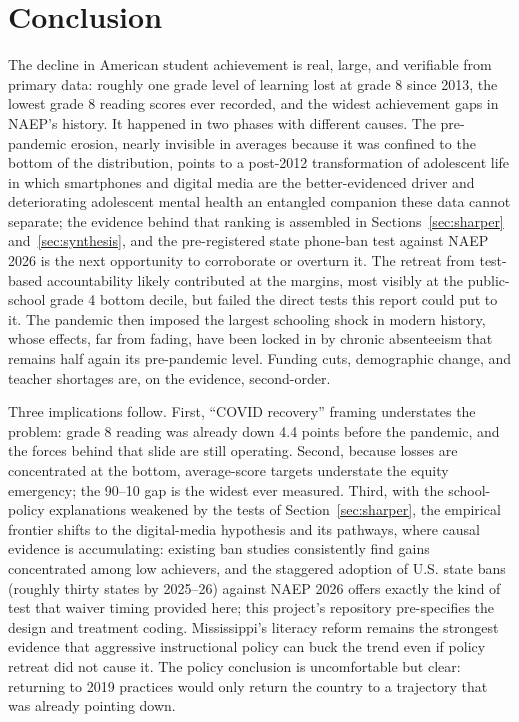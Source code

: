 \documentclass[11pt]{article}
\begin{document}
\section{Conclusion}

The decline in American student achievement is real, large, and verifiable from primary data: roughly one grade level of learning lost at grade 8 since 2013, the lowest grade 8 reading scores ever recorded, and the widest achievement gaps in NAEP's history. It happened in two phases with different causes. The pre-pandemic erosion, nearly invisible in averages because it was confined to the bottom of the distribution, points to a post-2012 transformation of adolescent life in which smartphones and digital media are the better-evidenced driver and deteriorating adolescent mental health an entangled companion these data cannot separate; the evidence behind that ranking is assembled in Sections~\ref{sec:sharper} and~\ref{sec:synthesis}, and the pre-registered state phone-ban test against NAEP 2026 is the next opportunity to corroborate or overturn it. The retreat from test-based accountability likely contributed at the margins, most visibly at the public-school grade 4 bottom decile, but failed the direct tests this report could put to it. The pandemic then imposed the largest schooling shock in modern history, whose effects, far from fading, have been locked in by chronic absenteeism that remains half again its pre-pandemic level. Funding cuts, demographic change, and teacher shortages are, on the evidence, second-order.

Three implications follow. First, ``COVID recovery'' framing understates the problem: grade 8 reading was already down 4.4 points before the pandemic, and the forces behind that slide are still operating. Second, because losses are concentrated at the bottom, average-score targets understate the equity emergency; the 90--10 gap is the widest ever measured. Third, with the school-policy explanations weakened by the tests of Section~\ref{sec:sharper}, the empirical frontier shifts to the digital-media hypothesis and its pathways, where causal evidence is accumulating: existing ban studies \citep{belandmurphy2016,abrahamsson2024,beneito2022,figlio2025} consistently find gains concentrated among low achievers, and the staggered adoption of U.S. state bans (roughly thirty states by 2025--26) against NAEP 2026 offers exactly the kind of test that waiver timing provided here; this project's repository pre-specifies the design and treatment coding. Mississippi's literacy reform remains the strongest evidence that aggressive instructional policy can buck the trend even if policy retreat did not cause it. The policy conclusion is uncomfortable but clear: returning to 2019 practices would only return the country to a trajectory that was already pointing down.


\end{document}
